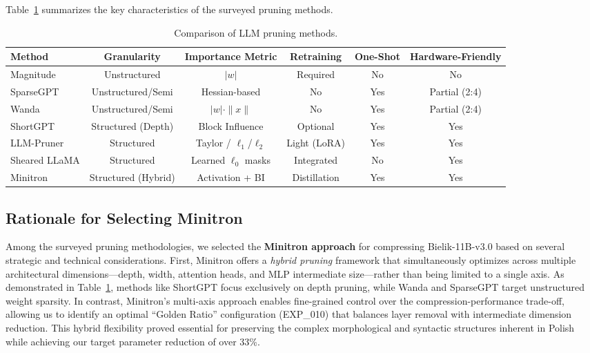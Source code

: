 \documentclass{article}
\begin{document}
Table~\ref{tab:pruning_comparison} summarizes the key characteristics of the surveyed pruning methods.

\begin{table}[ht]
    \centering
    \begin{tabular}{lccccc}
        \toprule
        \textbf{Method} & \textbf{Granularity} & \textbf{Importance Metric} & \textbf{Retraining} & \textbf{One-Shot} & \textbf{Hardware-Friendly} \\
        \midrule
        Magnitude \cite{han2015learning} & Unstructured & $|w|$ & Required & No & No \\
        SparseGPT \cite{frantar2023sparsegpt} & Unstructured/Semi & Hessian-based & No & Yes & Partial (2:4) \\
        Wanda \cite{sun2024wanda} & Unstructured/Semi & $|w| \cdot \|x\|$ & No & Yes & Partial (2:4) \\
        ShortGPT \cite{men2024shortgpt} & Structured (Depth) & Block Influence & Optional & Yes & Yes \\
        LLM-Pruner \cite{ma2024llmpruner} & Structured & Taylor / $\ell_1$/$\ell_2$ & Light (LoRA) & Yes & Yes \\
        Sheared LLaMA \cite{xia2024sheared} & Structured & Learned $\ell_0$ masks & Integrated & No & Yes \\
        Minitron \cite{muralidharan2024compact} & Structured (Hybrid) & Activation + BI & Distillation & Yes & Yes \\
        \bottomrule
    \end{tabular}
    \caption{Comparison of LLM pruning methods.}
    \label{tab:pruning_comparison}
\end{table}

\subsection{Rationale for Selecting Minitron}

Among the surveyed pruning methodologies, we selected the \textbf{Minitron approach} for compressing Bielik-11B-v3.0 based on several strategic and technical considerations. First, Minitron offers a \emph{hybrid pruning} framework that simultaneously optimizes across multiple architectural dimensions---depth, width, attention heads, and MLP intermediate size---rather than being limited to a single axis. As demonstrated in Table~\ref{tab:pruning_comparison}, methods like ShortGPT focus exclusively on depth pruning, while Wanda and SparseGPT target unstructured weight sparsity. In contrast, Minitron's multi-axis approach enables fine-grained control over the compression-performance trade-off, allowing us to identify an optimal ``Golden Ratio'' configuration (EXP\_010) that balances layer removal with intermediate dimension reduction. This hybrid flexibility proved essential for preserving the complex morphological and syntactic structures inherent in Polish while achieving our target parameter reduction of over 33\%.
\end{document}
